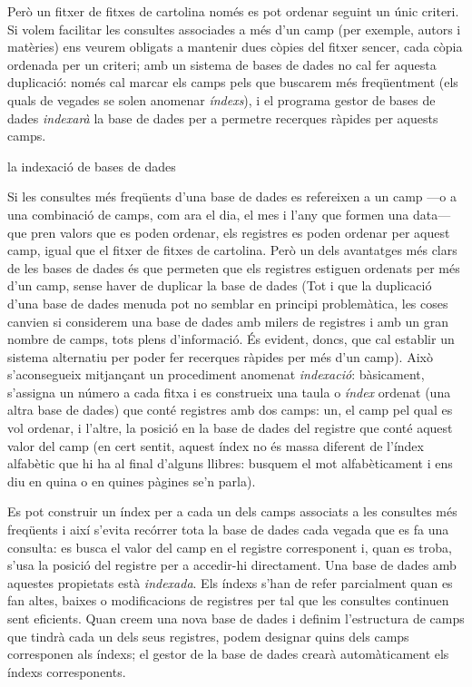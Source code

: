 Però un fitxer de fitxes de cartolina només es pot ordenar seguint un
únic criteri. Si volem facilitar les consultes associades a més d'un
camp (per exemple, autors i matèries) ens veurem obligats a mantenir
dues còpies del fitxer sencer, cada còpia ordenada per un criteri; amb
un sistema de bases de dades no cal fer aquesta duplicació: només cal
marcar els camps pels que buscarem més freqüentment (els quals de
vegades se solen anomenar \emph{índexs}), i el programa gestor de
bases de dades \emph{indexarà} la base de dades per a permetre
recerques ràpides per aquests camps.


\begin{persabermes}{la indexació de bases de dades}

  Si les consultes més freqüents d'una base de dades es refereixen a
  un camp ---o a una combinació de camps, com ara el dia, el mes i
  l'any que formen una data--- que pren valors que es poden ordenar,
  els registres es poden ordenar per aquest camp, igual que el fitxer
  de fitxes de cartolina. Però un dels avantatges més clars de les
  bases de dades és que permeten que els registres estiguen ordenats
  per més d'un camp, sense haver de duplicar la base de dades (Tot i
  que la duplicació d'una base de dades menuda pot no semblar en
  principi problemàtica, les coses canvien si considerem una base de
  dades amb milers de registres i amb un gran nombre de camps, tots
  plens d'informació.  És evident, doncs, que cal establir un sistema
  alternatiu per poder fer recerques ràpides per més d'un camp).  Això
  s'aconsegueix mitjançant un procediment anomenat \emph{indexació}:
  bàsicament, s'assigna un número a cada fitxa i es construeix una
  taula o \emph{índex} ordenat (una altra base de dades) que conté
  registres amb dos camps: un, el camp pel qual es vol ordenar, i
  l'altre, la posició en la base de dades del registre que conté
  aquest valor del camp (en cert sentit, aquest índex no és massa
  diferent de l'índex alfabètic que hi ha al final d'alguns llibres:
  busquem el mot alfabèticament i ens diu en quina o en quines pàgines
  se'n parla).

  Es pot construir un índex per a cada un dels camps associats a les
  consultes més freqüents i així s'evita recórrer tota la base de
  dades cada vegada que es fa una consulta: es busca el valor del camp
  en el registre corresponent i, quan es troba, s'usa la posició del
  registre per a accedir-hi directament. Una base de dades amb
  aquestes propietats està \emph{indexada}.
  Els índexs s'han de refer parcialment quan es fan altes, baixes o
  modificacions de registres per tal que les consultes continuen sent
  eficients. Quan creem una nova base de dades i definim l'estructura
  de camps que tindrà cada un dels seus registres, podem designar
  quins dels camps corresponen als índexs; el gestor de la base de
  dades crearà automàticament els índexs corresponents.


\end{persabermes}
